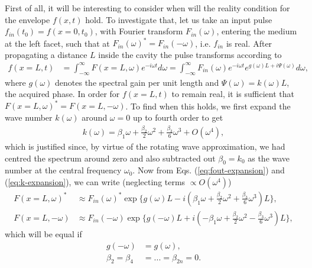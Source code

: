 \documentclass[preprint,secnumarabic,amssymb, nobibnotes, aip, prd]{revtex4-1}
\begin{document}
First of all, it will be interesting to consider when will the reality condition for the envelope $f(x,t) $  hold. To investigate that, let us take an input pulse $f_{in}(t_0) = f(x=0,t_0)$, with Fourier transform $F_{in}(\omega)$, entering the medium at the left facet, such that at $F_{in}(\omega)^* = F_{in}(-\omega)$, i.e. $f_{in}$ is real. After propagating a distance $L$ inside the cavity the pulse transforms according to \cite{weiner2011ultrafast}
\begin{align}
\label{eq:fout-expansion}
f(x=L,t) &= \int_{-\infty}^{\infty} F(x=L,\omega)e^{-i\omega t}d\omega = \int_{-\infty}^{\infty} F_{in}(\omega)e^{-i\omega t}e^{g(\omega)L+i\Psi(\omega)}d\omega,
\end{align}
where $g(\omega)$ denotes the spectral gain per unit length and $\Psi(\omega)=k(\omega)L$, the acquired phase. In order for $f(x=L,t)$ to remain real, it is sufficient that $F(x=L,\omega)^*= F(x=L,-\omega)$. To find when this holds, we first expand the wave number $k(\omega)$ around $\omega=0$ up to fourth order to get  
\begin{align}
\label{eq:k-expansion}
k(\omega) = \beta_1\omega + \frac{\beta_2}{2}\omega^2 + \frac{\beta_3}{6}\omega^3 + O(\omega^4), 
\end{align}
which is justified since, by virtue of the rotating wave approximation, we had centred the spectrum around zero and also subtracted out $\beta_0 = k_0$ as the wave number at the central frequency $\omega_0$. Now from Eqs. (\ref{eq:fout-expansion}) and (\ref{eq:k-expansion}), we can write (neglecting terms $\propto O(\omega^4)$)
\begin{subequations}
	\begin{align}
	F(x=L,\omega)^* &\approx F_{in}(\omega)^* \exp\{g(\omega)L-i(\beta_1\omega + \frac{\beta_2}{2}\omega^2 + \frac{\beta_3}{6}\omega^3 )L\}, \\
	F(x=L,-\omega) &\approx F_{in}(-\omega) \exp\{g(-\omega)L+i(-\beta_1\omega + \frac{\beta_2}{2}\omega^2 - \frac{\beta_3}{6}\omega^3 )L\},
	\end{align}
\end{subequations}
which will be equal if
\begin{subequations}
	\begin{align}
	g(-\omega) &= g(\omega), \label{eq:symmetric-gain}\\
	\beta_2 = \beta_4 &= ... = \beta_{2n}=0. \label{eq:vanish-even-order-dispersion}
	\end{align}
\end{subequations}
\end{document}
